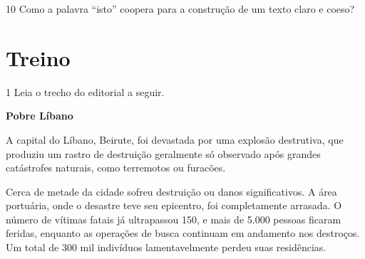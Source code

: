 \num{10} Como a palavra ``isto'' coopera para a construção de um texto
claro e coeso? 

\section{Treino}

\num{1} Leia o trecho do editorial a seguir.

\textbf{Pobre Líbano}

A capital do Líbano, Beirute, foi devastada por uma explosão destrutiva,
que produziu um rastro de destruição geralmente só observado após
grandes catástrofes naturais, como terremotos ou furacões.

Cerca de metade da cidade sofreu destruição ou danos significativos. A
área portuária, onde o desastre teve seu epicentro, foi completamente
arrasada. O número de vítimas fatais já ultrapassou 150, e mais de 5.000
pessoas ficaram feridas, enquanto as operações de busca continuam em
andamento nos destroços. Um total de 300 mil indivíduos lamentavelmente
perdeu suas residências.

